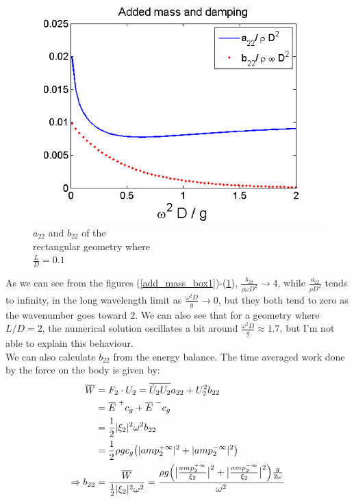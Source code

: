 \documentclass[a4paper,10pt]{article}
\begin{document}
\begin{figure}[H]
  \includegraphics[width=\linewidth]{ad_mass_box3.png}
  \caption{$a_{22}$ and $b_{22}$ of the\\ rectangular geometry where\\ $\frac{L}{D}=0.1$}\label{add_mass_box3}
\endminipage
\end{figure}

As we can see from the figures (\ref{add_mass_box1})-(\ref{add_mass_box3}), $\frac{b_{22}}{\rho \omega D^2} \rightarrow 4$, while $\frac{a_{22}}{\rho D^2}$ tends to infinity, in the long wavelength limit as $\frac{\omega^2 D}{g} \rightarrow 0$, but they both tend to zero as the wavenumber goes toward $2$. We can also see that for a geometry where $L/D = 2$, the numerical solution oscillates a bit around $\frac{\omega^2 D}{g} \approx 1.7$, but I'm not able to explain this behaviour.\\[1em]

We can also calculate $b_{22}$ from the energy balance. The time averaged work done by the force on the body is given by:
\begin{align}
\overline{W} &= F_2 \cdot U_2 = \overline{\dot U_2 U_2}a_{22} + U_2^2 b_{22}\\
&= \overline{E}^{\hspace{1mm} +} c_g + \overline{E}^{\hspace{1mm} -} c_g\\
&= \frac{1}{2} \vert \xi_2 \vert^2 \omega^2 b_{22}\\
&= \frac{1}{2} \rho g c_g \big(\vert amp_2^{+ \infty} \vert^2 + \vert amp_2^{- \infty} \vert^2\big)\\
\Rightarrow b_{22} &= \frac{\overline{W}}{\frac{1}{2} \vert \xi_2 \vert^2 \omega^2} = \frac{\rho g \Big( \big\vert \frac{amp_2^{+ \infty}}{\xi_2} \big\vert^2 +  \big\vert \frac{amp_2^{- \infty}}{\xi_2} \big\vert^2 \Big) \frac{g}{2 \omega}}{\omega^2} \label{work}
\end{align}
\end{document}

